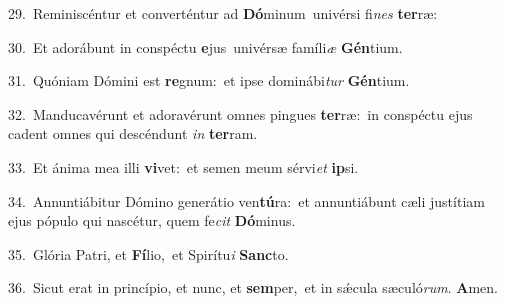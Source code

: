 {\numbfont\textcolor{\numbcolor}{29.}}~Reminiscéntur et converténtur ad \textbf{Dó}\-minum~\star univérsi fi\textit{nes} \textbf{ter}\-ræ:\par
{\numbfont\textcolor{\numbcolor}{30.}}~Et adorábunt in conspéctu \textbf{e}\-jus~\star univérsæ famíli\textit{æ} \textbf{Gén}\-tium.\par
{\numbfont\textcolor{\numbcolor}{31.}}~Quóniam Dómini est \textbf{re}\-gnum:~\star et ipse dominábi\textit{tur} \textbf{Gén}\-tium.\par
{\numbfont\textcolor{\numbcolor}{32.}}~Manducavérunt et adoravérunt omnes pingues \textbf{ter}\-ræ:~\star in conspéctu ejus cadent omnes qui descéndunt \textit{in} \textbf{ter}\-ram.\par
{\numbfont\textcolor{\numbcolor}{33.}}~Et ánima mea illi \textbf{vi}\-vet:~\star et semen meum sérvi\textit{et} \textbf{ip}\-si.\par
{\numbfont\textcolor{\numbcolor}{34.}}~Annuntiábitur Dómino generátio ven\-\textbf{tú}\-ra:~\star et annuntiábunt cæli justítiam ejus pópulo qui nascétur, quem fe\textit{cit} \textbf{Dó}\-minus.\par
{\numbfont\textcolor{\numbcolor}{35.}}~Glória Patri, et \textbf{Fí}\-lio,~\star et Spirítu\textit{i} \textbf{Sanc}\-to.\par
{\numbfont\textcolor{\numbcolor}{36.}}~Sicut erat in princípio, et nunc, et \textbf{sem}\-per,~\star et in sǽcula sæculó\-\textit{rum}\-. \textbf{A}\-men.\par
